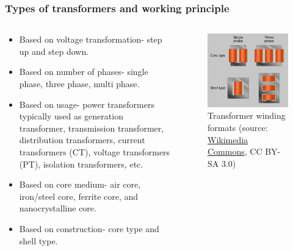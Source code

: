 \begin{frame}
	\frametitle{Types of transformers and working principle}
    \begin{columns}
     \begin{column}{0.55\textwidth}
      \begin{itemize}
          \item Based on voltage transformation- step up and step down.
          \item Based on number of phases- single phase, three phase, multi phase. 
          \item Based on usage- power transformers typically used as generation transformer, transmission transformer, distribution transformers, current transformers (CT), voltage transformers (PT), isolation transformers, etc. 
          \item Based on core medium- air core, iron/steel core, ferrite core, and nanocrystalline core.
          \item Based on construction- core type and shell type. 
      \end{itemize}      
      \end{column}
      \begin{column}{0.45\textwidth}
      			\onslide<1->
			\begin{figure}
				\centering
				\includegraphics[height=0.575\textheight]{fig/lec04/Transformer_winding_formats.jpg}
                \caption{Transformer winding formats (source: \href{https://commons.wikimedia.org/wiki/File:Transformer_winding_formats.jpg}{Wikimedia Commons}, CC BY-SA 3.0)}
			\end{figure}
      \end{column}
    \end{columns}   
\end{frame}

